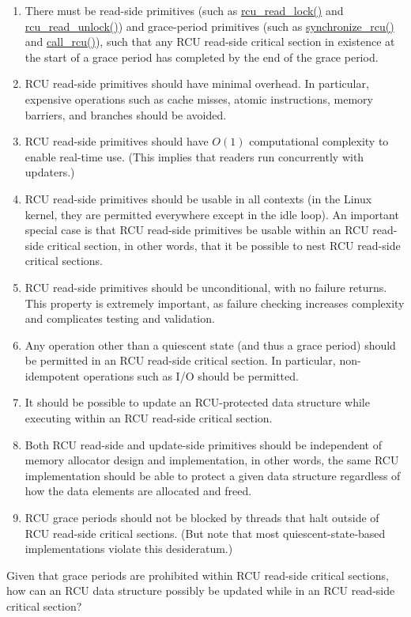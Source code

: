 \begin{enumerate}
\item	There must be read-side primitives (such as \url{rcu_read_lock()}
	and \url{rcu_read_unlock()}) and grace-period primitives
	(such as \url{synchronize_rcu()} and \url{call_rcu()}), such
	that any RCU read-side critical section in existence at the
	start of a grace period has completed by the end of the
	grace period.
\item	RCU read-side primitives should have minimal overhead.
	In particular, expensive operations such as cache misses,
	atomic instructions, memory barriers, and branches should
	be avoided.
\item	RCU read-side primitives should have $O(1)$ computational
	complexity to enable real-time use.
	(This implies that readers run concurrently with updaters.)
\item	RCU read-side primitives should be usable in all contexts
	(in the Linux kernel, they are permitted everywhere except in
	the idle loop).
	An important special case is that RCU read-side primitives be
	usable within an RCU read-side critical section, in other words,
	that it be possible to nest RCU read-side critical sections.
\item	RCU read-side primitives should be unconditional, with no
	failure returns.
	This property is extremely important, as failure checking
	increases complexity and complicates testing and validation.
\item	Any operation other than a quiescent state (and thus a grace
	period) should be permitted in an RCU read-side critical section.
	In particular, non-idempotent operations such as I/O should be
	permitted.
\item	It should be possible to update an RCU-protected data structure
	while executing within an RCU read-side critical section.
\item	Both RCU read-side and update-side primitives should be independent
	of memory allocator design and implementation, in other words,
	the same RCU implementation should be able to protect a given
	data structure regardless of how the data elements are allocated
	and freed.
\item	RCU grace periods should not be blocked by threads that
	halt outside of RCU read-side critical sections.
	(But note that most quiescent-state-based implementations
	violate this desideratum.)
\end{enumerate}

\QuickQuiz{}
	Given that grace periods are prohibited within RCU read-side
	critical sections, how can an RCU data structure possibly be
	updated while in an RCU read-side critical section?
 \QuickQuizEnd
